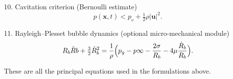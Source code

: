 10. Cavitation criterion (Bernoulli estimate)
\[
p(\mathbf{x},t) < p_v + \tfrac12\rho|\mathbf{u}|^2.
\]

11. Rayleigh–Plesset bubble dynamics (optional micro-mechanical module)
\[
R_b\ddot{R}b + \tfrac32\dot{R}_b^2 = \frac{1}{\rho}\Bigl(p_g - p\infty - \frac{2\sigma}{R_b}-4\mu\frac{\dot{R}_b}{R_b}\Bigr).
\]

These are all the principal equations used in the formulations above. 

